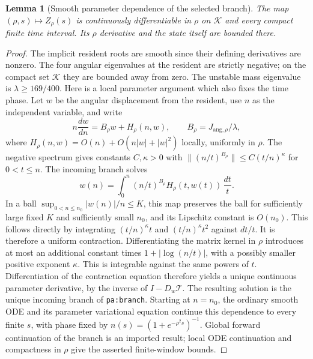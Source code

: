 \documentclass[11pt]{article}
\numberwithin{equation}{section}
\newtheorem{lemma}[theorem]{Lemma}
\theoremstyle{remark}\newtheorem{remark}[theorem]{Remark}
\newcommand{\1}{\mathbf 1}
\begin{document}
\begin{lemma}[Smooth parameter dependence of the selected branch]
\label{inc:AN06:v1:branchsmooth}
The map $(\rho,s)\mapsto Z_\rho(s)$ is continuously differentiable in
$\rho$ on $\mathcal K$ and every compact finite time interval. Its
$\rho$ derivative and the state itself are bounded there.
\end{lemma}
\begin{proof}
The implicit resident roots are smooth since their defining derivatives
are nonzero. The four angular eigenvalues at the resident are strictly
negative; on the compact set $\mathcal K$ they are bounded away from zero.
The unstable mass eigenvalue is $\lambda\ge169/400$.
Here is a local parameter argument which also fixes the time phase.
Let $w$ be the angular displacement from the resident, use $n$ as the
independent variable, and write
\[
 n\frac{dw}{dn}=B_\rho w+H_\rho(n,w),\qquad
 B_\rho=J_{\mathrm{ang},\rho}/\lambda,
\]
where $H_\rho(n,w)=O(n)+O(n|w|+|w|^2)$ locally, uniformly in $\rho$.
The negative spectrum gives constants $C,\kappa>0$ with
$\|(n/t)^{B_\rho}\|\le C(t/n)^\kappa$ for $0<t\le n$.
The incoming branch solves
\[
 w(n)=\int_0^n(n/t)^{B_\rho}H_\rho(t,w(t))\,\frac{dt}{t}.
\]
In a ball $\sup_{0<n\le n_0}|w(n)|/n\le K$, this map preserves the ball
for sufficiently large fixed $K$ and sufficiently small $n_0$, and its
Lipschitz constant is $O(n_0)$. This follows directly by integrating
$(t/n)^\kappa t$ and $(t/n)^\kappa t^2$ against $dt/t$.
It is therefore a uniform contraction.
Differentiating the matrix kernel in $\rho$ introduces at most an
additional constant times $1+|\log(n/t)|$, with a possibly smaller
positive exponent $\kappa$. This is integrable against the same powers
of $t$. Differentiation of the contraction equation therefore yields a
unique continuous parameter derivative, by the inverse of $I-D_w\mathcal T$.
The resulting solution is the unique incoming branch of
\texttt{pa:branch}. Starting at $n=n_0$, the ordinary smooth ODE and its
parameter variational equation continue this dependence to every finite
$s$, with phase fixed by $n(s)=(1+e^{-\rho^2s})^{-1}$.
Global forward continuation of the branch is an imported result; local
ODE continuation and compactness in $\rho$ give the asserted finite-window
bounds.
\end{proof}
\end{document}
